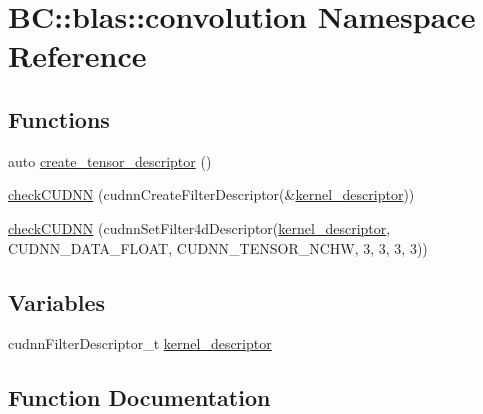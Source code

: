 \hypertarget{namespaceBC_1_1blas_1_1convolution}{}\section{BC\+:\+:blas\+:\+:convolution Namespace Reference}
\label{namespaceBC_1_1blas_1_1convolution}
\subsection*{Functions}
\begin{DoxyCompactItemize}
\item 
auto \hyperlink{namespaceBC_1_1blas_1_1convolution_a732cbb4e8873415584422599f22ed0c1}{create\+\_\+tensor\+\_\+descriptor} ()
\item 
\hyperlink{namespaceBC_1_1blas_1_1convolution_abf5282787ff4db9770ab3794bdfe1262}{check\+C\+U\+D\+NN} (cudnn\+Create\+Filter\+Descriptor(\&\hyperlink{namespaceBC_1_1blas_1_1convolution_a6fe3450977c24517c281f840aafd358e}{kernel\+\_\+descriptor}))
\item 
\hyperlink{namespaceBC_1_1blas_1_1convolution_a608d4f6c6793b629555f3c353637be0d}{check\+C\+U\+D\+NN} (cudnn\+Set\+Filter4d\+Descriptor(\hyperlink{namespaceBC_1_1blas_1_1convolution_a6fe3450977c24517c281f840aafd358e}{kernel\+\_\+descriptor}, C\+U\+D\+N\+N\+\_\+\+D\+A\+T\+A\+\_\+\+F\+L\+O\+AT, C\+U\+D\+N\+N\+\_\+\+T\+E\+N\+S\+O\+R\+\_\+\+N\+C\+HW, 3, 3, 3, 3))
\end{DoxyCompactItemize}
\subsection*{Variables}
\begin{DoxyCompactItemize}
\item 
cudnn\+Filter\+Descriptor\+\_\+t \hyperlink{namespaceBC_1_1blas_1_1convolution_a6fe3450977c24517c281f840aafd358e}{kernel\+\_\+descriptor}
\end{DoxyCompactItemize}


\subsection{Function Documentation}
